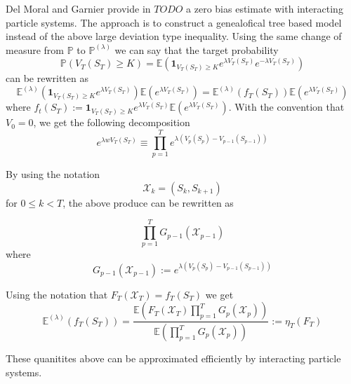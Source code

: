 Del Moral and Garnier provide in $TODO$ a zero bias estimate with interacting particle systems. The approach is to construct a genealofical tree based model instead of the above large deviation type inequality.
Using the same change of measure from $\mathbb{P}$ to $\mathbb{P}^{(\lambda)}$ we can say that the target probability
$$\mathbb{P}(V_T(S_T) \geq K) = \mathbb{E}\left( \mathbf{1}_{V_T(S_T) \geq K}e^{\lambda V_T(S_T)}e^{-\lambda V_T(S_T)} \right)$$
can be rewritten as
$$\mathbb{E}^{(\lambda)} \left(  \mathbf{1}_{V_T(S_T) \geq K} e^{\lambda V_T(S_T)} \right) \mathbb{E} \left(e^{\lambda V_T(S_T)}\right) = 
\mathbb{E}^{(\lambda)}(f_T(S_T)) \mathbb{E}(e^{\lambda V_T(S_T)})  $$
where $f_t(S_T) := \mathbf{1}_{V_T(S_T) \geq K}e^{\lambda V_T(S_T)} \mathbb{E}\left(e^{\lambda V_T(S_T)}\right) $. With the convention that $V_0 = 0$, we get the following decomposition
$$e^{\lambda w V_T(S_T)} \equiv \prod_{p=1}^{T} e^{\lambda (V_p(S_p) - V_{p-1}(S_{p-1}))}$$

By using the notation $$\mathcal{X}_k = (S_k, S_{k+1})$$ for $0 \leq k < T$, the above produce can be rewritten as

$$\prod_{p=1}^{T} G_{p-1}(\mathcal{X}_{p-1})$$ where
$$G_{p-1}(\mathcal{X}_{p-1}) := e^{\lambda (V_p(S_p) - V_{p-1}(S_{p-1}))}$$

Using the notation that $F_T(\mathcal{X}_T) = f_T(S_T)$ we get
\begin{equation}
\mathbb{E}^{(\lambda)}(f_T(S_T)) = \frac{\mathbb{E}(F_T(\mathcal{X}_T)\prod_{p=1}^{T}G_p(\mathcal{X}_p))}{\mathbb{E}(\prod_{p=1}^{T}G_p(\mathcal{X}_p))} := \eta_T(F_T)
\end{equation}

These quanitites above can be approximated efficiently by interacting particle systems.

